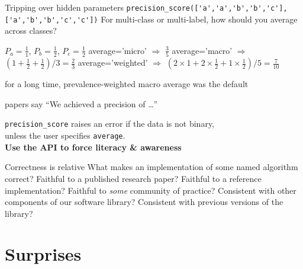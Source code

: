 \documentclass[aspectratio=169, 22pt]{beamer}
\newcommand{\hl}{\textcolor{usydred}}
\begin{document}
\begin{points}{Tripping over hidden parameters}
	\p 
\verb|precision_score(['a','a','b','b','c'], ['a','b','b','c','c'])|
	\p For multi-class or multi-label, how should you average across classes?
	\begin{itemize}
\p $P_a = \frac{1}{1}$, $P_b = \frac{1}{2}$, $P_c = \frac{1}{2}$
\p average='micro' $\Rightarrow$ $\frac{3}{5}$
\p average='macro' $\Rightarrow$ $(1 + \frac{1}{2} + \frac{1}{2}) / 3 = \frac{2}{3}$
\p average='weighted' $\Rightarrow$ $(2\times1 + 2\times\frac{1}{2} + 1\times\frac{1}{2}) / 5 = \frac{7}{10}$
	\end{itemize}
	\p for a long time, prevalence-weighted macro average was the default
	\begin{itemize}
	\p[$\therefore$] papers say ``We achieved a precision of \dots''
	\end{itemize}
	\pause
\p[Solution] \verb|precision_score| raises an error if the data is not binary,\\
unless the user specifies \verb|average|. \pause\\ \hfill \textbf{\hl{Use the API to force literacy \& awareness}}
\end{points}

\begin{points}{Correctness is relative}
	\p What makes an implementation of some named algorithm \hl{correct}?
	\vfill
	\p Faithful to a published research paper?
	\p Faithful to a reference implementation?
	\p Faithful to \emph{some} community of practice?
	\p Consistent with other components of our software library?
	\p Consistent with previous versions of the library?
\end{points}

\section{Surprises}
\end{document}
